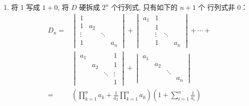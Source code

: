 \begin{enumerate}
\begin{enumerate}
              \item 将 1 写成 $1+0$, 将 $D$ 硬拆成 $2^{n}$ 个行列式, 只有如下的 $n+1$ 个 行列式非 0：
                    \begin{align*}
                        D_n = & \begin{vmatrix}
                                    1      &       &        &       \\
                                    1      & a_{2} &        &       \\
                                    \vdots &       & \ddots &       \\
                                    1      &       &        & a_{n}
                                \end{vmatrix}
                        +\begin{vmatrix}
                             a_{1} & 1      &                \\
                                   & 1      &                \\
                                   & \vdots & \ddots &       \\
                                   & 1      &        & a_{n}
                         \end{vmatrix}+\cdots+              \\
                              & \begin{vmatrix}
                                    a_{1} &       &        & 1      \\
                                          & a_{2} &        & 1      \\
                                          &       & \ddots & \vdots \\
                                          &       &        & 1
                                \end{vmatrix}
                        +\begin{vmatrix}
                             a_{1} &                      \\
                                   & a_{2} &              \\
                                   &       & \ddots &     \\
                                   &       &        & a_n
                         \end{vmatrix}                 \\
                        =     & \left(\prod_{k=1}^{n} a_{k}+\frac{1}{a_{2}}
                        \prod_{k=1}^{n} a_{k}\right)\left(1+\sum_{i=1}^{n} \frac{1}{a_{i}}\right)
                    \end{align*}
          \end{enumerate}


\end{enumerate}
